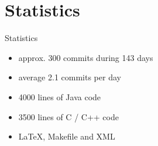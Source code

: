 \section{Statistics}
\begin{frame}{Statistics}
	\begin{itemize}
		\item approx. 300 commits during 143 days
		\item average 2.1 commits per day
		\item 4000 lines of Java code
		\item 3500 lines of C / C++ code
		\item LaTeX, Makefile and XML
	\end{itemize}
\end{frame}
